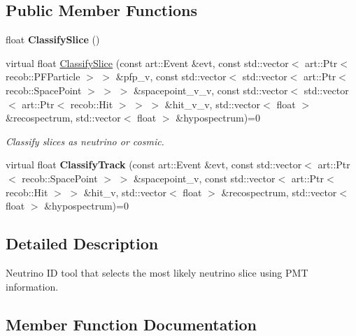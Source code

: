 \subsection*{Public Member Functions}
\begin{DoxyCompactItemize}
\item 
float {\bfseries Classify\+Slice} ()\hypertarget{classflashmatch_1_1FlashMatchingToolBase_a8133f8cf2289dd17d0a05ba2a3c02da4}{}\label{classflashmatch_1_1FlashMatchingToolBase_a8133f8cf2289dd17d0a05ba2a3c02da4}

\item 
virtual float \hyperlink{classflashmatch_1_1FlashMatchingToolBase_a79d9ba4fe96a0b887631c8ae62f7cbcd}{Classify\+Slice} (const art\+::\+Event \&evt, const std\+::vector$<$ art\+::\+Ptr$<$ recob\+::\+P\+F\+Particle $>$ $>$ \&pfp\+\_\+v, const std\+::vector$<$ std\+::vector$<$ art\+::\+Ptr$<$ recob\+::\+Space\+Point $>$ $>$ $>$ \&spacepoint\+\_\+v\+\_\+v, const std\+::vector$<$ std\+::vector$<$ art\+::\+Ptr$<$ recob\+::\+Hit $>$ $>$ $>$ \&hit\+\_\+v\+\_\+v, std\+::vector$<$ float $>$ \&recospectrum, std\+::vector$<$ float $>$ \&hypospectrum)=0
\begin{DoxyCompactList}\small\item\em Classify slices as neutrino or cosmic. \end{DoxyCompactList}\item 
virtual float {\bfseries Classify\+Track} (const art\+::\+Event \&evt, const std\+::vector$<$ art\+::\+Ptr$<$ recob\+::\+Space\+Point $>$ $>$ \&spacepoint\+\_\+v, const std\+::vector$<$ art\+::\+Ptr$<$ recob\+::\+Hit $>$ $>$ \&hit\+\_\+v, std\+::vector$<$ float $>$ \&recospectrum, std\+::vector$<$ float $>$ \&hypospectrum)=0\hypertarget{classflashmatch_1_1FlashMatchingToolBase_a3fc65b46bbcebf7d47ead748ef6f5b01}{}\label{classflashmatch_1_1FlashMatchingToolBase_a3fc65b46bbcebf7d47ead748ef6f5b01}

\end{DoxyCompactItemize}


\subsection{Detailed Description}
Neutrino ID tool that selects the most likely neutrino slice using P\+MT information. 

\subsection{Member Function Documentation}
